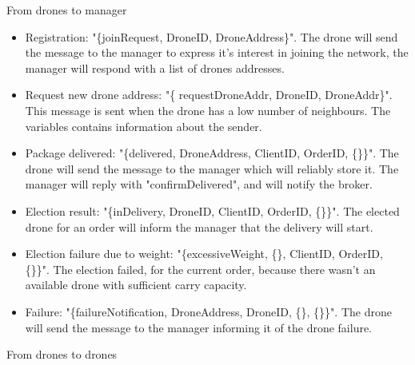 \documentclass[a4paper, oneside]{memoir}
\begin{document}
From drones to manager
\begin{itemize}
	\item Registration:  "\{joinRequest, DroneID, DroneAddress\}".
	The drone will send the message to the manager to express it's interest in joining the network, the manager will respond with a list of drones addresses.

	\item Request new drone address: "\{ requestDroneAddr, DroneID, DroneAddr\}".
	This message is sent when the drone has a low number of neighbours. The variables contains information about the sender.

	\item Package delivered: "\{delivered, DroneAddress, ClientID, OrderID, \{\}\}".
	The drone will send the message to the manager which will reliably store it. The manager will reply with "confirmDelivered", and will notify the broker.

	\item Election result: "\{inDelivery, DroneID, ClientID, OrderID, \{\}\}".
	The elected drone for an order will inform the manager that the delivery will start.

	\item Election failure due to weight: "\{excessiveWeight, \{\}, ClientID, OrderID, \{\}\}".
	The election failed, for the current order, because there wasn't an available drone with sufficient carry capacity.

	\item Failure:  "\{failureNotification, DroneAddress, DroneID, \{\}, \{\}\}".
	The drone will send the message to the manager informing it of the drone failure.
\end{itemize} \vspace{1em}
From drones to drones
\end{document}
